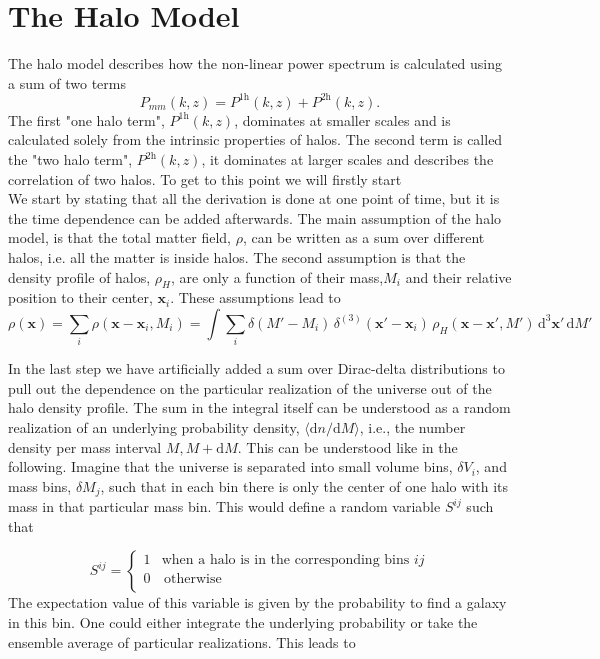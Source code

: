 \documentclass[oneside]{book}
\newcommand*{\rd}{\mathrm{d}}
\begin{document}
\section{The Halo Model}
The halo model describes how the non-linear power spectrum is calculated using a sum of two terms 
\begin{equation}
    P_{mm}(k,z) = P^\mathrm{1h}(k,z) + P^\mathrm{2h}(k,z).
\end{equation}
The first "one halo term", $P^\mathrm{1h}(k,z)$, dominates at smaller scales and is calculated solely from the intrinsic properties of halos. The second term is called the "two halo term", $P^\mathrm{2h}(k,z)$, it dominates at larger scales and describes the correlation of two halos. To get to this point we will firstly start\\
We start by stating that all the derivation is done at one point of time, but it is the time dependence can be added afterwards.
The main assumption of the halo model, is that the total matter field, $\rho$, can be written as a sum over different halos, i.e. all the matter is inside halos. 
The second assumption is that the density profile of halos, $\rho_H$, are only a function of their mass,$M_i$ and their relative position to their center, $\boldsymbol{x}_i$. These assumptions lead to 
\begin{equation}
\label{eq:halo_denisity_field}
\rho(\boldsymbol{x}) = \sum_i \rho(\boldsymbol{x}-\boldsymbol{x}_i,M_i)=\int \sum_i \delta(M'-M_i)\,\delta^{(3)}(\boldsymbol{x}'-\boldsymbol{x}_i)\,\rho_H(\boldsymbol{x}-\boldsymbol{x}',M')\, \rd^3 \boldsymbol{x}' \, \rd M'
\end{equation}

In the last step we have artificially added a sum over Dirac-delta distributions to pull out the dependence on the particular realization of the universe out of the halo density profile. The sum in the integral itself can be understood as a random realization of an underlying probability density, $\langle \rd n/\rd M \rangle$, i.e., the number density per mass interval $M,M+\rd M$. This can be understood like in the following. Imagine that the universe is separated into small volume bins, $\delta V_i$, and mass bins, $\delta M_j$, such that in each bin there is only the center of one halo with its mass in that particular mass bin. This would define a random variable $S^{ij}$ such that 

\begin{equation*}
S^{ij} = \left\{ \begin{array}{ll}
    1 & \text{when a halo is in the corresponding bins } ij \\
    0 & \, \textrm{otherwise} \\
    \end{array}  \right.    
\end{equation*}
The expectation value of this variable is given by the probability to find a galaxy in this bin. One could either integrate the underlying probability or take the ensemble average of particular realizations. This leads to
\end{document}
